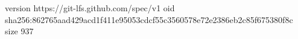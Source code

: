 version https://git-lfs.github.com/spec/v1
oid sha256:862765aad429acd1f411e95053cdcf55c3560578e72e2386eb2c85f675380f8c
size 937

